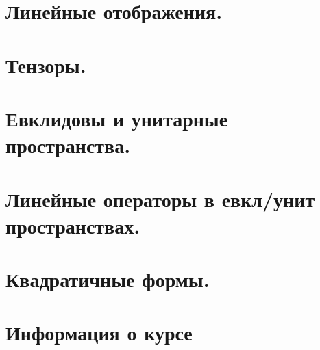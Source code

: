 \maketitle
\tableofcontents
\newpage
\section{Линейные отображения.}

\newpage
\section{Тензоры.}

\newpage
\section{Евклидовы и унитарные пространства.}

\newpage
\section{Линейные операторы в евкл/унит пространствах.}

\newpage
\section{Квадратичные формы.}

\newpage
\section{Информация о курсе}

